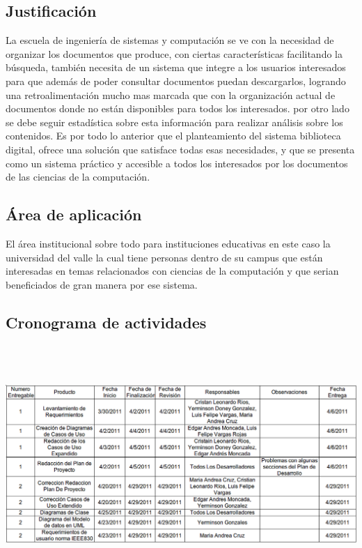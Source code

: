 \documentclass[]{article}
\begin{document}
        \subsection{Justificación}
        La escuela de ingeniería de sistemas y computación se ve con la necesidad de organizar los
        documentos que produce, con ciertas características facilitando la búsqueda, también
        necesita de un sistema que integre a los usuarios interesados para que además de poder
        consultar documentos puedan descargarlos, logrando una retroalimentación mucho mas marcada
        que con la organización actual de documentos donde no están disponibles para todos los
        interesados. por otro lado se debe seguir estadística sobre esta información para realizar
        análisis sobre los contenidos.
        Es por todo lo anterior que el planteamiento del sistema biblioteca digital, ofrece una
        solución que satisface todas esas necesidades, y que se presenta como un sistema práctico y
        accesible a todos los interesados por los documentos de las ciencias de la computación.
        
        \subsection{Área de aplicación}
        El área institucional sobre todo para instituciones educativas en este caso la universidad
        del valle la cual tiene personas dentro de su campus que están interesadas en temas 
        relacionados con ciencias de la computación y que serian beneficiados de gran manera por
        ese sistema.
        
        \subsection{Cronograma de actividades}
        \begin{minipage}[c]{1\linewidth}
                \centering
                \includegraphics[width=16cm, height=9cm]{Cronograma2}
        \end{minipage}
        
\end{document}
